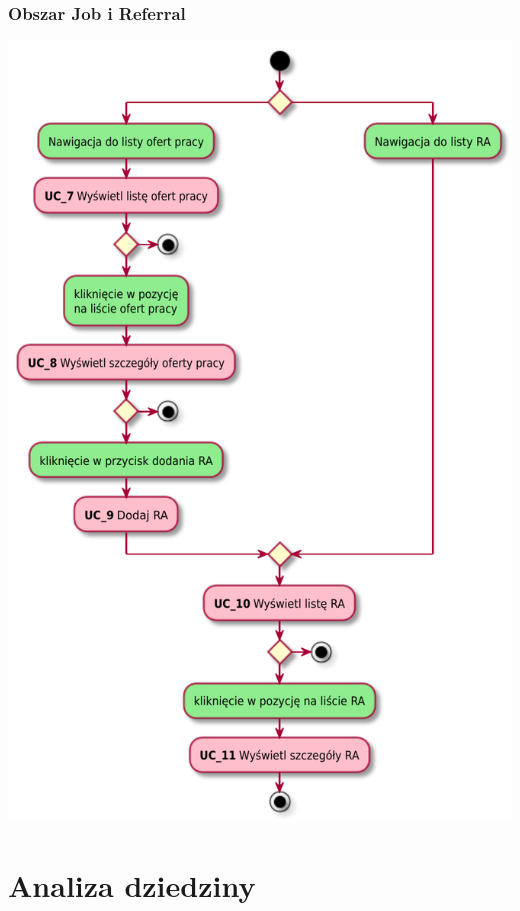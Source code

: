 \documentclass[oneside]{scrreprt}
\begin{document}
\subsection{Obszar Job i Referral}
\includegraphics[width=\textwidth, keepaspectratio]{graphics/activity_diagram_job_referral.pdf}

\chapter{Analiza dziedziny}
\end{document}
